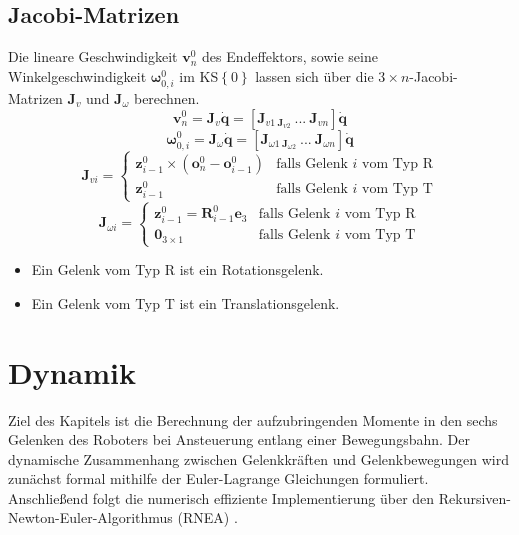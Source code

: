 \subsection*{Jacobi-Matrizen}
Die lineare Geschwindigkeit $\bm{v}^0_n$ des Endeffektors, sowie seine Winkelgeschwindigkeit $\bm{\omega}^0_{0,i}$ im  KS$\left\{0\right\}$ lassen sich über die $3\times n$-Jacobi-Matrizen $\bm{J}_v$ und $\bm{J}_{\omega}$ berechnen. 
%
\begin{equation}
	\bm{v}^0_n = \bm{J}_v \dot{\bm{q}} = \left[\bm{J}_{v1 \ \bm{J}_{v2}} \ ...\  \bm{J}_{vn}\right] \dot{\bm{q}}
\end{equation}
%
\begin{equation}
	\bm{\omega}^0_{0,i} = \bm{J}_{\omega} \dot{\bm{q}}  = \left[\bm{J}_{\omega1 \ \bm{J}_{\omega2}} \ ...\  \bm{J}_{\omega n}\right] \dot{\bm{q}}
\end{equation}
%
\begin{equation}
	\bm{J}_{vi} = \begin{cases} 
		\bm{z}^0_{i-1} \times (\bm{o}^0_{n} - \bm{o}^0_{i-1}) & \text{falls Gelenk } i \text{ vom Typ } \text{R} \\
		\bm{z}^0_{i-1} & \text{falls Gelenk } i \text{ vom Typ } \text{T}
	\end{cases}
\end{equation}
%
\begin{equation}
	\bm{J}_{\omega i} = \begin{cases} 
		\bm{z}^0_{i-1} = \bm{R}^0_{i-1}\bm{e}_3 & \text{falls Gelenk } i \text{ vom Typ } \text{R} \\
		\mathbf{0}_{3 \times 1} & \text{falls Gelenk } i \text{ vom Typ } \text{T}
	\end{cases}
\end{equation}
%
\begin{itemize}
	\item Ein Gelenk vom Typ R ist ein Rotationsgelenk.
	\item Ein Gelenk vom Typ T ist ein Translationsgelenk.
\end{itemize}
%
\cite{Rieber.2022}
%
\section{Dynamik}
Ziel des Kapitels ist die Berechnung der aufzubringenden Momente in den sechs Gelenken des Roboters bei Ansteuerung entlang einer Bewegungsbahn.
Der dynamische Zusammenhang zwischen Gelenkkräften und Gelenkbewegungen wird zunächst formal mithilfe der Euler-Lagrange Gleichungen formuliert. Anschließend folgt die numerisch effiziente Implementierung  über den Rekursiven-Newton-Euler-Algorithmus (RNEA) \cite[S.~247]{Grimble.2009}. 
%
